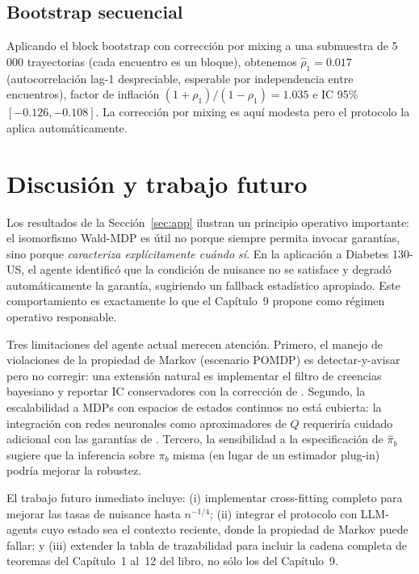 \documentclass[11pt,a4paper]{article}
\theoremstyle{mitheorem}
\theoremstyle{mitdef}
\begin{document}
\subsection{Bootstrap secuencial}

Aplicando el block bootstrap con corrección por mixing
\cite{liao2021offpolicy} a una submuestra de 5\,000 trayectorias (cada
encuentro es un bloque), obtenemos $\hat\rho_1 = 0.017$ (autocorrelación
lag-1 despreciable, esperable por independencia entre encuentros),
factor de inflación $(1+\rho_1)/(1-\rho_1) = 1.035$ e IC 95\%
$[-0.126, -0.108]$. La corrección por mixing es aquí modesta pero el
protocolo la aplica automáticamente.

\section{Discusión y trabajo futuro}
\label{sec:discusion}

Los resultados de la Sección~\ref{sec:app} ilustran un principio
operativo importante: el isomorfismo Wald-MDP es útil no porque
siempre permita invocar garantías, sino porque \emph{caracteriza
explícitamente cuándo sí}. En la aplicación a Diabetes 130-US, el
agente identificó que la condición de nuisance no se satisface y
degradó automáticamente la garantía, sugiriendo un fallback
estadístico apropiado. Este comportamiento es exactamente lo que el
Capítulo~9 propone como régimen operativo responsable.

Tres limitaciones del agente actual merecen atención. Primero, el
manejo de violaciones de la propiedad de Markov (escenario POMDP) es
detectar-y-avisar pero no corregir: una extensión natural es
implementar el filtro de creencias bayesiano y reportar IC
conservadores con la corrección de \citet{shi2020does}. Segundo,
la escalabilidad a MDPs con espacios de estados continuos no está
cubierta: la integración con redes neuronales como aproximadores de
$Q$ requeriría cuidado adicional con las garantías de
\citet{chernozhukov2018doubleml}. Tercero, la sensibilidad a la
especificación de $\hat\pi_b$ sugiere que la inferencia sobre
$\pi_b$ misma (en lugar de un estimador plug-in) podría mejorar la
robustez.

El trabajo futuro inmediato incluye: (i) implementar cross-fitting
completo para mejorar las tasas de nuisance hasta $n^{-1/4}$;
(ii) integrar el protocolo con LLM-agents cuyo estado sea el
contexto reciente, donde la propiedad de Markov puede fallar; y
(iii) extender la tabla de trazabilidad para incluir la cadena
completa de teoremas del Capítulo~1 al~12 del libro, no sólo los del
Capítulo~9.
\end{document}
